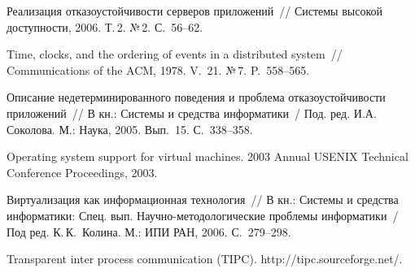 \begin{multicols}{2}
{{\begin{thebibliography}{99}
Реализация отказоустойчивости серверов приложений~// Системы высокой
доступности, 2006. Т.\,2. №\,2. С.~56--62.

Time, clocks, and the ordering of events in a distributed system~//
Communications of the ACM, 1978. V.~21. №\,7. P.~558--565.

Описание недетерминированного поведения и проблема отказоустойчивости
приложений~// В кн.: Системы и средства информатики~/ Под. ред. И.А.
Соколова. М.: Наука, 2005.  Вып.~15. С.~338--358.

Operating system support for virtual machines.
2003 Annual USENIX Technical Conference Proceedings, 2003.

Виртуализация как информационная технология~// В кн.: Системы и
средства информатики: Спец. вып. Научно-методологические проблемы
информатики~/ Под ред. К.\,К.~Колина. М.: ИПИ РАН, 2006. С.~279--298.

Transparent inter process communication (TIPC). {\sf
http://tipc.sourceforge.net/}.
\end{thebibliography}

}
}

\end{multicols}



%
%
%
%
%
%
\label{end\stat}